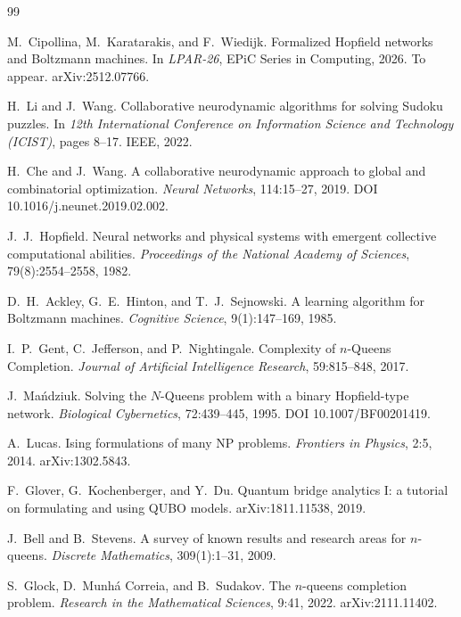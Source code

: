 \documentclass{easychair}
\begin{document}
\begin{thebibliography}{99}

M.~Cipollina, M.~Karatarakis, and F.~Wiedijk.
\newblock Formalized Hopfield networks and Boltzmann machines.
\newblock In \emph{LPAR-26}, EPiC Series in Computing, 2026. To appear. arXiv:2512.07766.

H.~Li and J.~Wang.
\newblock Collaborative neurodynamic algorithms for solving Sudoku puzzles.
\newblock In \emph{12th International Conference on Information Science and Technology (ICIST)},
pages 8--17. IEEE, 2022.

H.~Che and J.~Wang.
\newblock A collaborative neurodynamic approach to global and combinatorial optimization.
\newblock \emph{Neural Networks}, 114:15--27, 2019. DOI 10.1016/j.neunet.2019.02.002.

J.~J.~Hopfield.
\newblock Neural networks and physical systems with emergent collective computational abilities.
\newblock \emph{Proceedings of the National Academy of Sciences}, 79(8):2554--2558, 1982.

D.~H.~Ackley, G.~E.~Hinton, and T.~J.~Sejnowski.
\newblock A learning algorithm for Boltzmann machines.
\newblock \emph{Cognitive Science}, 9(1):147--169, 1985.

I.~P.~Gent, C.~Jefferson, and P.~Nightingale.
\newblock Complexity of $n$-Queens Completion.
\newblock \emph{Journal of Artificial Intelligence Research}, 59:815--848, 2017.

J.~Ma\'{n}dziuk.
\newblock Solving the $N$-Queens problem with a binary Hopfield-type network.
\newblock \emph{Biological Cybernetics}, 72:439--445, 1995. DOI 10.1007/BF00201419.

A.~Lucas.
\newblock Ising formulations of many NP problems.
\newblock \emph{Frontiers in Physics}, 2:5, 2014. arXiv:1302.5843.

F.~Glover, G.~Kochenberger, and Y.~Du.
\newblock Quantum bridge analytics I: a tutorial on formulating and using QUBO models.
\newblock arXiv:1811.11538, 2019.

J.~Bell and B.~Stevens.
\newblock A survey of known results and research areas for $n$-queens.
\newblock \emph{Discrete Mathematics}, 309(1):1--31, 2009.

S.~Glock, D.~Munh\'{a} Correia, and B.~Sudakov.
\newblock The $n$-queens completion problem.
\newblock \emph{Research in the Mathematical Sciences}, 9:41, 2022. arXiv:2111.11402.


\end{thebibliography}
\end{document}
